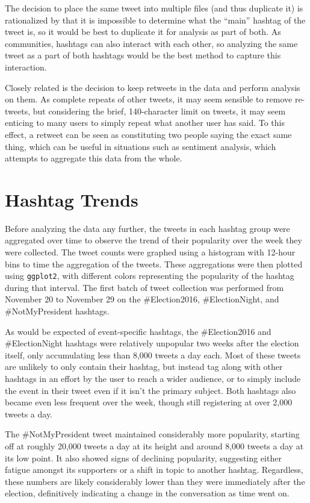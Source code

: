 \documentclass[prodmode]{acmsmall} %
\begin{document}
The decision to place the same tweet into multiple files (and thus duplicate it)
is rationalized by that it is impossible to determine what the ``main'' hashtag
of the tweet is, so it would be best to duplicate it for analysis as part of
both. As communities, hashtags can also interact with each other, so analyzing
the same tweet as a part of both hashtags would be the best method to capture
this interaction.

Closely related is the decision to keep retweets in the data and perform
analysis on them. As complete repeats of other tweets, it may seem sensible to
remove re-tweets, but considering the brief, 140-character limit on tweets, it
may seem enticing to many users to simply repeat what another user has said. To
this effect, a retweet can be seen as constituting two people saying the exact
same thing, which can be useful in situations such as sentiment analysis, which
attempts to aggregate this data from the whole.

\section{Hashtag Trends}
Before analyzing the data any further, the tweets in each hashtag group were
aggregated over time to observe the trend of their popularity over the week they
were collected. The tweet counts were graphed using a histogram with 12-hour
bins to time the aggregation of the tweets. These aggregations were then plotted
using \verb|ggplot2|, with different colors representing the popularity of the
hashtag during that interval. The first batch of tweet collection was performed
from November 20 to November 29 on the \#Election2016, \#ElectionNight, and
\#NotMyPresident hashtags.

As would be expected of event-specific hashtags, the \#Election2016 and
\#ElectionNight hashtags were relatively unpopular two weeks after the election
itself, only accumulating less than 8,000 tweets a day each. Most of these
tweets are unlikely to only contain their hashtag, but instead tag along with
other hashtags in an effort by the user to reach a wider audience, or to simply
include the event in their tweet even if it isn't the primary subject. Both
hashtags also became even less frequent over the week, though still registering
at over 2,000 tweets a day.
 
The \#NotMyPresident tweet maintained considerably more popularity, starting off
at roughly 20,000 tweets a day at its height and around 8,000 tweets a day at
its low point. It also showed signs of declining popularity, suggesting either
fatigue amongst its supporters or a shift in topic to another hashtag.
Regardless, these numbers are likely considerably lower than they were
immediately after the election, definitively indicating a change in the
conversation as time went on.
\end{document}
